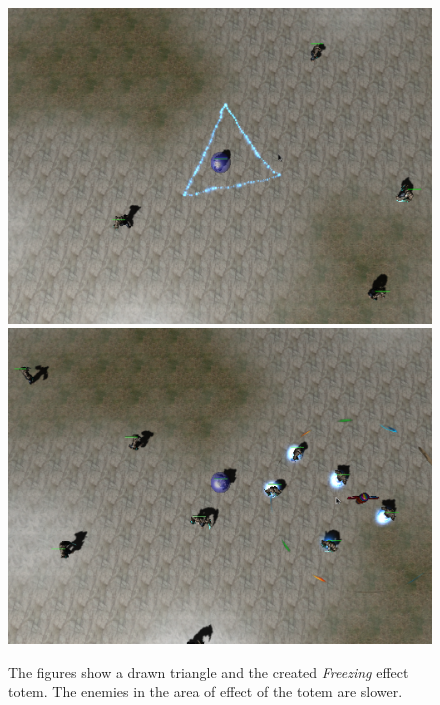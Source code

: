 \begin{figure}[p]
\centering
\includegraphics[width=.9\linewidth]{ext/scr/triangle.png}
\quad
\includegraphics[width=.9\linewidth]{ext/scr/trianglee.png}
\caption{The figures show a drawn triangle and the created \emph{Freezing} effect totem. The enemies in the area of effect of the totem are slower.}
\label{fig:spell:triangle}
\end{figure}

